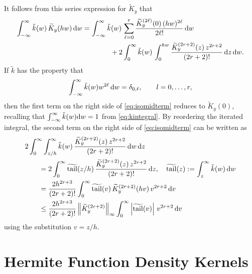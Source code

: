 \documentclass[letterpaper]{amsart}
\newcommand{\tKY}{\widetilde{K}_y}
\newcommand{\tk}{\tilde{k}}
\DeclareMathOperator{\ttk}{\widetilde{tail}}
\begin{document}
It follows from this series expression for $\tKY$ that
\begin{align} \label{eq:isomidterm}
	\int_{-\infty}^{\infty} \tk(w) \, \tKY(hw) \, \dif w & =
	\int_{-\infty}^{\infty} \tk(w) \, \sum_{\ell = 0}^{r} \frac{\tKY^{(2\ell)}(0) \, (hw)^{2\ell}}{2\ell!}  \, \dif w \\
	&
	\nonumber
	\qquad \qquad
	+ 2 \int_{0}^{\infty} \tk(w) \,  \int_0^{hw} \frac{\tKY^{(2r+2)}(z) \,  z^{2r+2}}{(2r+2)!} \, \dif z  \, \dif w.
\end{align}
If $\tk$ has the property that
\begin{equation} \label{eq:tkprop}
	\int_{-\infty}^{\infty} \tk(w) w^{2\ell}  \, \dif w =  \delta_{0,\ell}, \qquad l=0,\dots,r,
\end{equation}
then the first term on the right side of \eqref{eq:isomidterm} reduces to $\tKY(0)$, recalling that $\int_{-\infty}^\infty \tilde{k}(w) {\rm d} w = 1$ from \eqref{eq:kintegral}.   By reordering the iterated integral, the  second term on the right side of  \eqref{eq:isomidterm} can be written as
\begin{align*}
	\MoveEqLeft{2 \int_{0}^{\infty}  \int_{z/h}^\infty \tk(w) \, \frac{\tKY^{(2r+2)}(z) \,  z^{2r+2}}{(2r+2)!}   \, \dif w \, \dif z} \\
	& =  2\int_{0}^{\infty}  \ttk(z/h) \, \frac{\tKY^{(2r+2)}(z) \,  z^{2r+2}}{(2r+2)!}    \, \dif z,
	\quad \ttk(z) := \int_{z}^\infty \tk(w) \, \dif w \\
	& =  \frac{2h^{2r+3}}{(2r+2)!} \int_{0}^{\infty}  \ttk(v) \, \tKY^{(2r+2)}(hv) \,  v^{2r+2}    \, \dif v \\
	&  \le  \frac{2h^{2r+3}}{(2r+2)!}  \norm[\infty]{\tKY^{(2r+2)}} \int_{0}^{\infty}  \abs{\ttk(v)}  \,  v^{2r+2}    \, \dif v \\
\end{align*}
using the substitution $v = z/h$.

\section{Hermite Function Density Kernels}
\end{document}
